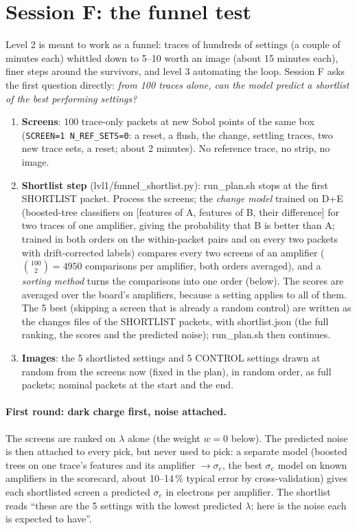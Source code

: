\documentclass[11pt]{article}
\begin{document}
\section{Session F: the funnel test}\label{sec:funnel}

Level 2 is meant to work as a funnel: traces of hundreds of settings (a couple of minutes each) whittled down to 5--10
worth an image (about 15 minutes each), finer steps around the survivors, and level 3 automating the loop. Session F
asks the first question directly: \emph{from 100 traces alone, can the model predict a shortlist of the best
performing settings?}
\begin{enumerate}
\item \textbf{Screens}: 100 trace-only packets at new Sobol points of the same box (\texttt{SCREEN=1 N\_REF\_SETS=0}: a
  reset, a flush, the change, settling traces, two new trace sets, a reset; about 2 minutes). No reference trace, no
  strip, no image.
\item \textbf{Shortlist step} (lvl1/funnel\_shortlist.py): run\_plan.sh stops at the first SHORTLIST packet. Process the
  screens; the \emph{change model} trained on D+E (boosted-tree classifiers on [features of A, features of B, their
  difference] for two traces of one amplifier, giving the probability that B is better than A; trained in both orders on
  the within-packet pairs and on every two packets with drift-corrected labels) compares every two screens of an amplifier ($\binom{100}{2}=4950$ comparisons per amplifier,
  both orders averaged), and a \emph{sorting method} turns the comparisons into one order (below). The scores are
  averaged over the board's amplifiers, because a setting applies to all of them. The 5 best (skipping a screen that is
  already a random control) are written as the changes files of the SHORTLIST packets, with shortlist.json (the full
  ranking, the scores and the predicted noise); run\_plan.sh then continues.
\item \textbf{Images}: the 5 shortlisted settings and 5 CONTROL settings drawn at random from the screens now (fixed in
  the plan), in random order, as full packets; nominal packets at the start and the end.
\end{enumerate}

\paragraph{First round: dark charge first, noise attached.} The screens are ranked on $\lambda$ alone (the weight
$w=0$ below). The predicted noise is then attached to every pick, but never used to pick: a separate model (boosted
trees on one trace's features and its amplifier $\to\sigma_e$, the best $\sigma_e$ model on known amplifiers in the
scorecard, about 10--14\,\% typical error by cross-validation) gives each shortlisted screen a predicted $\sigma_e$ in
electrons per amplifier. The shortlist reads ``these are the 5 settings with the lowest predicted $\lambda$; here is the
noise each is expected to have''.
\end{document}
